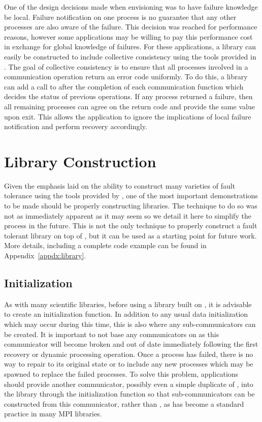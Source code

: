 One of the design decisions made when envisioning \ulfm was to have failure 
knowledge be local. Failure notification on one process is no guarantee that any 
other processes are also aware of the failure. This decision was reached for 
performance reasons, however some applications may be willing to pay this 
performance cost in exchange for global knowledge of failures. For these 
applications, a library can easily be constructed to 
include collective consistency using the tools provided in \ulfm. The goal of 
collective consistency is to ensure that all processes involved in a 
communication operation return an error code uniformly. To do this, a library 
can add a call to  after the completion of each 
communication function which decides the status of previous operations. If any 
process returned a failure, then all remaining processes can agree on the return 
code and provide the same value upon exit. This allows the application to ignore 
the implications of local failure notification and perform recovery accordingly.

\section{Library Construction}
\label{sec:apps:library}

Given the emphasis laid on the ability to construct many varieties of fault 
tolerance using the tools provided by \ulfm, one of the most important 
demonstrations to be made should be properly constructing libraries. The 
technique to do so was not as immediately apparent as it may seem so we detail 
it here to simplify the process in the future. This is not the only technique to 
properly construct a fault tolerant library on top of \ulfm, but it can be used 
as a starting point for future work. More details, including a complete code example can be found in Appendix~\ref{appdx:library}.

\subsection{Initialization}
\label{subsec:apps:library:init}

As with many scientific libraries, before using a library built on \ulfm, it is 
advisable to create an initialization function. In addition to any usual data 
initialization which may occur during this time, this is also where any 
sub-communicators can be created. It is important to not base any communicators 
on  as this communicator will become broken and out of 
date immediately following the first recovery or dynamic processing operation. Once a process has failed, there 
is no way to repair  to its original state or to 
include any new processes which may be spawned to replace the failed processes. 
To solve this problem, applications should provide another communicator, possibly 
even a simple duplicate of , into the library through 
the initialization function so that sub-communicators can be constructed from 
this communicator, rather than , as has become a 
standard practice in many MPI libraries.

